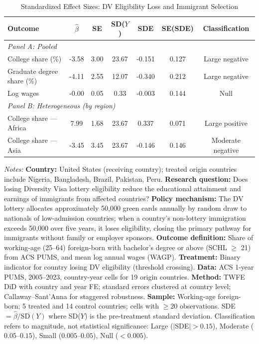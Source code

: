 \begin{table}[t]
\centering
\caption{Standardized Effect Sizes: DV Eligibility Loss and Immigrant Selection}
\label{tab:sde}
\small
\begin{threeparttable}
\begin{tabular}{lcccccc}
\toprule
Outcome & $\hat{\beta}$ & SE & SD($Y$) & SDE & SE(SDE) & Classification \\
\midrule
\multicolumn{7}{l}{\textit{Panel A: Pooled}} \\
College share (\%) & -3.58 & 3.00 & 23.67 & -0.151 & 0.127 & Large negative \\
Graduate degree share (\%) & -4.11 & 2.55 & 12.07 & -0.340 & 0.212 & Large negative \\
Log wages & -0.00 & 0.05 & 0.33 & -0.003 & 0.144 & Null \\
\midrule
\multicolumn{7}{l}{\textit{Panel B: Heterogeneous (by region)}} \\
College share — Africa & 7.99 & 1.68 & 23.67 & 0.337 & 0.071 & Large positive \\
College share — Asia & -3.45 & 3.45 & 23.67 & -0.146 & 0.146 & Moderate negative \\
\bottomrule
\end{tabular}
\begin{tablenotes}[flushleft]
\small
\item \textit{Notes:} \textbf{Country:} United States (receiving country); treated origin countries include Nigeria, Bangladesh, Brazil, Pakistan, Peru. \textbf{Research question:} Does losing Diversity Visa lottery eligibility reduce the educational attainment and earnings of immigrants from affected countries? \textbf{Policy mechanism:} The DV lottery allocates approximately 50,000 green cards annually by random draw to nationals of low-admission countries; when a country's non-lottery immigration exceeds 50,000 over five years, it loses eligibility, closing the primary pathway for immigrants without family or employer sponsors. \textbf{Outcome definition:} Share of working-age (25--64) foreign-born with bachelor's degree or above (SCHL $\geq$ 21) from ACS PUMS, and mean log annual wages (WAGP). \textbf{Treatment:} Binary indicator for country losing DV eligibility (threshold crossing). \textbf{Data:} ACS 1-year PUMS, 2005--2023, country-year cells for 19 origin countries. \textbf{Method:} TWFE DiD with country and year FE; standard errors clustered at country level; Callaway--Sant'Anna for staggered robustness. \textbf{Sample:} Working-age foreign-born; 5 treated and 14 control countries; cells with $\geq 20$ observations. SDE $= \hat{\beta} / \text{SD}(Y)$ where SD($Y$) is the pre-treatment standard deviation. Classification refers to magnitude, not statistical significance: Large ($|$SDE$| > 0.15$), Moderate ($0.05$--$0.15$), Small ($0.005$--$0.05$), Null ($< 0.005$).
\end{tablenotes}
\end{threeparttable}
\end{table}
